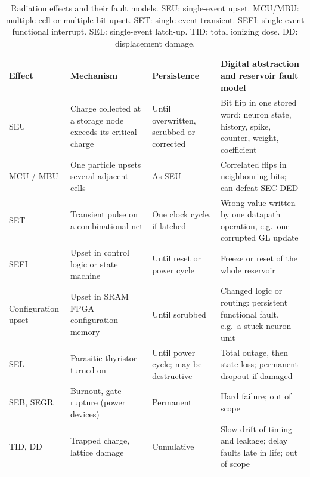 \documentclass[11pt,a4paper]{article}
\begin{document}
\begin{table}[h]
\centering
\small
\begin{tabularx}{\textwidth}{@{}l>{\raggedright\arraybackslash}p{3.6cm}>{\raggedright\arraybackslash}p{2.4cm}>{\raggedright\arraybackslash}X@{}}
\toprule
Effect & Mechanism & Persistence & Digital abstraction and reservoir fault model \\
\midrule
SEU & Charge collected at a storage node exceeds its critical charge & Until overwritten, scrubbed or corrected & Bit flip in one stored word: neuron state, history, spike, counter, weight, coefficient \\
MCU / MBU & One particle upsets several adjacent cells & As SEU & Correlated flips in neighbouring bits; can defeat SEC-DED \\
SET & Transient pulse on a combinational net & One clock cycle, if latched & Wrong value written by one datapath operation, e.g.\ one corrupted GL update \\
SEFI & Upset in control logic or state machine & Until reset or power cycle & Freeze or reset of the whole reservoir \\
Configuration upset & Upset in SRAM FPGA configuration memory & Until scrubbed & Changed logic or routing: persistent functional fault, e.g.\ a stuck neuron unit \\
SEL & Parasitic thyristor turned on & Until power cycle; may be destructive & Total outage, then state loss; permanent dropout if damaged \\
SEB, SEGR & Burnout, gate rupture (power devices) & Permanent & Hard failure; out of scope \\
TID, DD & Trapped charge, lattice damage & Cumulative & Slow drift of timing and leakage; delay faults late in life; out of scope \\
\bottomrule
\end{tabularx}
\caption{Radiation effects and their fault models. SEU: single-event upset. MCU/MBU: multiple-cell or multiple-bit upset. SET: single-event transient. SEFI: single-event functional interrupt. SEL: single-event latch-up. TID: total ionizing dose. DD: displacement damage.}
\label{tab:taxonomy}
\end{table}
\end{document}
